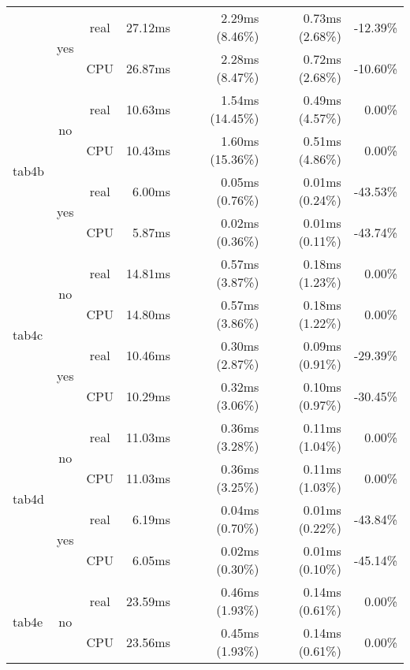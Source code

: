 \documentclass[en]{pracamgr}
\begin{document}
\begin{appendices}
\begin{small}
\begin{longtable}{|l|c|c|r|r|r|r|}
                          \cline{2-7}
                          & \multirow{2}{*}{yes} & real & 27.12ms & 2.29ms (8.46\%) & 0.73ms (2.68\%) & -12.39\% \\*
                          &                      & CPU  & 26.87ms & 2.28ms (8.47\%) & 0.72ms (2.68\%) & -10.60\% \\
\hline
\multirow{4}{*}{tab4b}    & \multirow{2}{*}{no}  & real & 10.63ms & 1.54ms (14.45\%) & 0.49ms (4.57\%) & 0.00\% \\*
                          &                      & CPU  & 10.43ms & 1.60ms (15.36\%) & 0.51ms (4.86\%) & 0.00\% \\*
                          \cline{2-7}
                          & \multirow{2}{*}{yes} & real & 6.00ms & 0.05ms (0.76\%) & 0.01ms (0.24\%) & -43.53\% \\*
                          &                      & CPU  & 5.87ms & 0.02ms (0.36\%) & 0.01ms (0.11\%) & -43.74\% \\
\hline
\multirow{4}{*}{tab4c}    & \multirow{2}{*}{no}  & real & 14.81ms & 0.57ms (3.87\%) & 0.18ms (1.23\%) & 0.00\% \\*
                          &                      & CPU  & 14.80ms & 0.57ms (3.86\%) & 0.18ms (1.22\%) & 0.00\% \\*
                          \cline{2-7}
                          & \multirow{2}{*}{yes} & real & 10.46ms & 0.30ms (2.87\%) & 0.09ms (0.91\%) & -29.39\% \\*
                          &                      & CPU  & 10.29ms & 0.32ms (3.06\%) & 0.10ms (0.97\%) & -30.45\% \\
\hline
\multirow{4}{*}{tab4d}    & \multirow{2}{*}{no}  & real & 11.03ms & 0.36ms (3.28\%) & 0.11ms (1.04\%) & 0.00\% \\*
                          &                      & CPU  & 11.03ms & 0.36ms (3.25\%) & 0.11ms (1.03\%) & 0.00\% \\*
                          \cline{2-7}
                          & \multirow{2}{*}{yes} & real & 6.19ms & 0.04ms (0.70\%) & 0.01ms (0.22\%) & -43.84\% \\*
                          &                      & CPU  & 6.05ms & 0.02ms (0.30\%) & 0.01ms (0.10\%) & -45.14\% \\
\hline
\multirow{4}{*}{tab4e}    & \multirow{2}{*}{no}  & real & 23.59ms & 0.46ms (1.93\%) & 0.14ms (0.61\%) & 0.00\% \\*
                          &                      & CPU  & 23.56ms & 0.45ms (1.93\%) & 0.14ms (0.61\%) & 0.00\% \\*

\end{longtable}
\end{small}
\end{appendices}
\end{document}

